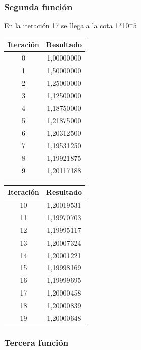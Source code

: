 \documentclass[titlepage,a4paper]{article}
\begin{document}
\subsubsection{Segunda función}\label{sec:bis2}

En la iteración 17 se llega a la cota 1*10$^-5$
\\
\begin{multicols}{2}
\begin{center}
    \begin{tabular}{| c | c |}
    \hline
     Iteración & Resultado \\ \hline
        0     & 1,00000000 \\
        1     & 1,50000000 \\
        2     & 1,25000000 \\
        3     & 1,12500000 \\
        4     & 1,18750000 \\
        5     & 1,21875000 \\
        6     & 1,20312500 \\
        7     & 1,19531250 \\
        8     & 1,19921875 \\
        9     & 1,20117188 \\
           \hline
    \end{tabular}
\end{center}
        \begin{center}
    \begin{tabular}{| c | c |}
    \hline
     Iteración & Resultado \\ \hline
        10    & 1,20019531 \\
        11    & 1,19970703 \\
        12    & 1,19995117 \\
        13    & 1,20007324 \\
        14    & 1,20001221 \\
        15    & 1,19998169 \\
        16    & 1,19999695 \\
        17    & 1,20000458 \\
        18    & 1,20000839 \\
        19    & 1,20000648 \\
    \hline
    \end{tabular}
\end{center}
\end{multicols}
\subsubsection{Tercera función}\label{sec:bis3}
\end{document}
